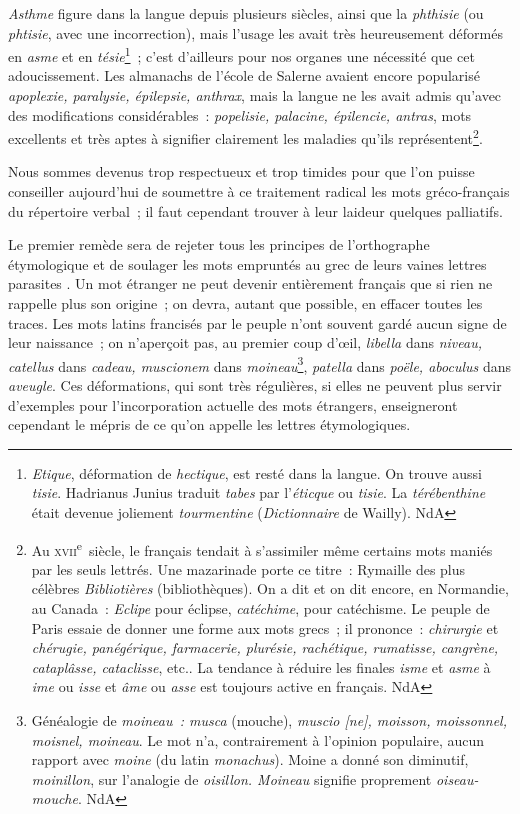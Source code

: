 \documentclass[french,twoside]{book} %
\begin{document}
{\itshape Asthme} figure dans la langue depuis plusieurs siècles, ainsi que la {\itshape phthisie} (ou {\itshape phtisie}, avec une incorrection), mais l’usage les avait très heureusement déformés en {\itshape asme} et en {\itshape tésie}\footnote{{\itshape Etique}, déformation de {\itshape hectique}, est resté dans la langue. On trouve aussi {\itshape tisie}. Hadrianus Junius traduit {\itshape tabes} par l’{\itshape éticque} ou {\itshape tisie}. La {\itshape térébenthine} était devenue joliement {\itshape tourmentine} ({\itshape Dictionnaire} de Wailly). NdA} ; c’est d’ailleurs pour nos organes une nécessité que cet adoucissement. Les almanachs de l’école de Salerne avaient encore popularisé {\itshape apoplexie, paralysie, épilepsie, anthrax}, mais la langue ne les avait admis qu’avec des modifications considérables : {\itshape popelisie, palacine, épilencie, antras}, mots excellents et très aptes à signifier clairement les maladies qu’ils représentent\footnote{Au \textsc{xvii}\textsuperscript{e} siècle, le français tendait à s’assimiler même certains mots maniés par les seuls lettrés. Une mazarinade porte ce titre : Rymaille des plus célèbres {\itshape Bibliotières} (bibliothèques). On a dit et on dit encore, en Normandie, au Canada : {\itshape Eclipe} pour éclipse, {\itshape catéchime}, pour catéchisme. Le peuple de Paris essaie de donner une forme aux mots grecs ; il prononce : {\itshape chirurgie} et {\itshape chérugie, panégérique, farmacerie, plurésie, rachétique, rumatisse, cangrène, cataplâsse, cataclisse}, etc.. La tendance à réduire les finales {\itshape isme} et {\itshape asme} à {\itshape ime} ou {\itshape isse} et {\itshape âme} ou {\itshape asse} est toujours active en français. NdA}.\par
Nous sommes devenus trop respectueux et trop timides pour que l’on puisse conseiller aujourd’hui de soumettre à ce traitement radical les mots gréco-français du répertoire verbal ; il faut cependant trouver à leur laideur quelques palliatifs.\par
Le premier remède sera de rejeter tous les principes de l’orthographe étymologique et de soulager les mots empruntés au grec de leurs vaines lettres parasites . Un mot étranger ne peut devenir entièrement français que si rien ne rappelle plus son origine ; on devra, autant que possible, en effacer toutes les traces. Les mots latins francisés par le peuple n’ont souvent gardé aucun signe de leur naissance ; on n’aperçoit pas, au premier coup d’œil, {\itshape libella} dans {\itshape niveau, catellus} dans {\itshape cadeau, muscionem} dans {\itshape moineau}\footnote{Généalogie de {\itshape moineau : musca} (mouche), {\itshape muscio [ne], moisson, moissonnel, moisnel, moineau}. Le mot n’a, contrairement à l’opinion populaire, aucun rapport avec {\itshape moine} (du latin {\itshape monachus}). Moine a donné son diminutif, {\itshape moinillon}, sur l’analogie de {\itshape oisillon. Moineau} signifie proprement {\itshape oiseau-mouche}. NdA}, {\itshape patella} dans {\itshape poële, aboculus} dans {\itshape aveugle}. Ces déformations, qui sont très régulières, si elles ne peuvent plus servir d’exemples pour l’incorporation actuelle des mots étrangers, enseigneront cependant le mépris de ce qu’on appelle les lettres étymologiques.\par
\end{document}
